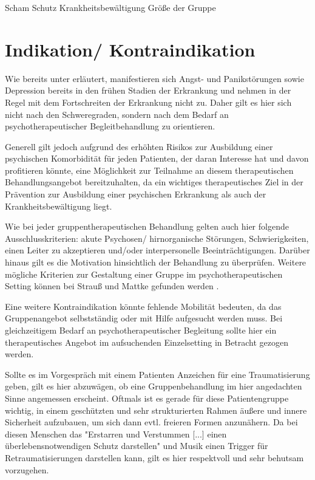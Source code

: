 Scham
Schutz
Krankheitsbewältigung
Größe der Gruppe

\section{Indikation/ Kontraindikation}
Wie bereits unter \label{psychische_komorbiditaet} erläutert, manifestieren sich Angst- und Panikstörungen sowie Depression bereits in den frühen Stadien der Erkrankung und nehmen in der Regel mit dem Fortschreiten der Erkrankung nicht zu. Daher gilt es hier sich nicht nach den Schweregraden, sondern nach dem Bedarf an psychotherapeutischer Begleitbehandlung zu orientieren. 

Generell gilt jedoch aufgrund des erhöhten Risikos zur Ausbildung einer psychischen Komorbidität für jeden Patienten, der daran Interesse hat und davon profitieren könnte, eine Möglichkeit zur Teilnahme an diesem therapeutischen Behandlungsangebot bereitzuhalten, da ein wichtiges therapeutisches Ziel in der Prävention zur Ausbildung einer psychischen Erkrankung als auch der Krankheitsbewältigung liegt.

Wie bei jeder gruppentherapeutischen Behandlung gelten auch hier folgende Ausschlusskriterien: akute Psychosen/ hirnorganische Störungen, Schwierigkeiten, einen Leiter zu akzeptieren und/oder interpersonelle Beeinträchtigungen. Darüber hinaus gilt es die Motivation hinsichtlich der Behandlung zu überprüfen. Weitere mögliche Kriterien zur Gestaltung einer Gruppe im psychotherapeutischen Setting können bei Strauß und Mattke gefunden werden \autocite[vgl.][78-88]{mattke2007}.

Eine weitere Kontraindikation könnte fehlende Mobilität bedeuten, da das Gruppenangebot selbstständig oder mit Hilfe aufgesucht werden muss. Bei gleichzeitigem Bedarf an psychotherapeutischer Begleitung sollte hier ein therapeutisches Angebot im aufsuchenden Einzelsetting in Betracht gezogen werden.

Sollte es im Vorgespräch mit einem Patienten Anzeichen für eine Traumatisierung geben, gilt es hier abzuwägen, ob eine Gruppenbehandlung im hier angedachten Sinne angemessen erscheint. Oftmals ist es gerade für diese Patientengruppe wichtig, in einem geschützten und sehr strukturierten Rahmen äußere und innere Sicherheit aufzubauen, um sich dann evtl. freieren Formen anzunähern. Da bei diesen Menschen das "Erstarren und Verstummen [...] einen überlebensnotwendigen Schutz darstellen" \autocite[68]{rittner2012} und Musik einen Trigger für Retraumatisierungen darstellen kann, gilt es hier respektvoll und sehr behutsam vorzugehen.

